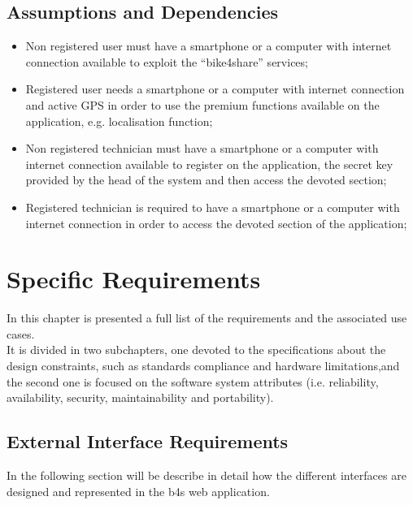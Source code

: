 \documentclass{article}
\begin{document}
\subsection{Assumptions and Dependencies}
\begin{itemize}
    \item Non registered user must have a smartphone or a computer with internet connection available to exploit the “bike4share” services;
    \item Registered user needs a smartphone or a computer with internet connection and active GPS in order to use the premium functions available on the application, e.g. localisation function;
    \item Non registered technician must have a smartphone or a computer with internet connection available to register on the application, the secret key provided by the head of the system and then access the devoted section;
    \item Registered technician is required to have a smartphone or a computer with internet connection in order to access the devoted section of the application;
\end{itemize}

\section{Specific Requirements}
In this chapter is presented a full list of the requirements and the associated use cases.\\It is divided in two subchapters, one devoted to the specifications about the design constraints, such as standards compliance and hardware limitations,and the second one is focused on the software system attributes (i.e. reliability, availability, security, maintainability and portability).

\subsection{External Interface Requirements}
In the following section will be describe in detail how the different interfaces are designed and represented in the b4s web application.
\end{document}
